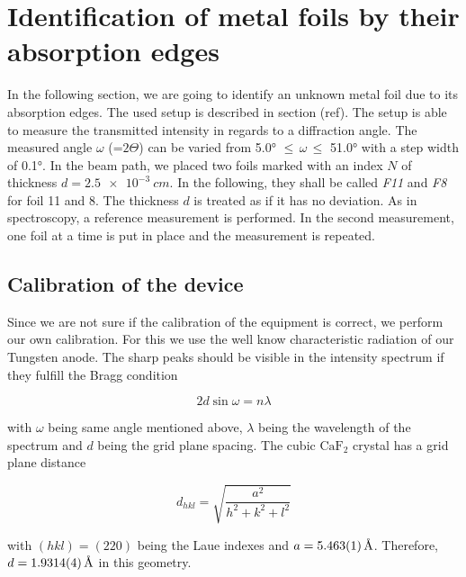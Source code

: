 \section{Identification of metal foils by their absorption edges}
\label{sec:absorb}

In the following section, we are going to identify an unknown metal foil due to its absorption edges. The used setup is described in section (ref).
The setup is able to measure the transmitted intensity in regards to a diffraction angle. The measured angle $\omega$ (=$2\Theta$) can be varied from 
5.0° $\leqslant \, \omega \, \leqslant$ 51.0° with a step width of 0.1°. In the beam path, we placed two foils marked with an index $N$ of thickness $d = \SI{2.5e-3}{cm}$. In the following, they shall be called \textit{F11} and \textit{F8} for foil 11 and 8.
The thickness $d$ is treated as if it has no deviation. As in spectroscopy, a reference measurement is performed. In the 
second measurement, one foil at a time is put in place and the measurement is repeated. 

\subsection{Calibration of the device}

Since we are not sure if the calibration of the equipment is correct, we perform our own calibration.
For this we use the well know characteristic radiation of our Tungsten anode. The sharp peaks should be visible in the 
intensity spectrum if they fulfill the Bragg condition

\begin{equation}
    2 d \sin{\omega} = n \lambda
\end{equation}

with $\omega$ being same angle mentioned above, $ \lambda $ being the wavelength of the spectrum and $d$ being the grid plane spacing. The cubic $\mathrm{CaF}_2$ crystal has a 
grid plane distance 

\begin{equation}
    d_{hkl} = \sqrt{\frac{a^2}{h^2+k^2+l^2}}
\end{equation}

with $(hkl) = (220) $ being the Laue indexes and $a = \SI{5.463 \pm 0.001 }{ \angstrom}$. Therefore, $d = \SI{1.9314 \pm 0.0004}{ \angstrom} $ in this geometry.

